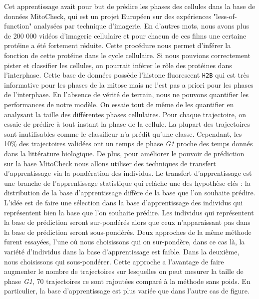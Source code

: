 \documentclass{article}
\begin{document}
Cet apprentissage avait pour but de prédire les phases des cellules dans la base de données MitoCheck, qui est un projet Européen sur des expériences "less-of-function" analysées par technique d'imagerie. En d'autres mots, nous avons plus de 200 000 vidéos d'imagerie cellulaire et pour chacun de ces films une certaine protéine a été fortement réduite. Cette procédure nous permet d'inférer la fonction de cette protéine dans le cycle cellulaire. Si nous pouvions correctement pister et classifier les cellules, on pourrait inférer le rôle des protéines dans l'interphase. Cette base de données possède l'histone fluorescent \texttt{H2B} qui est très informative pour les phases de la mitose mais ne l'est pas a priori pour les phases de l'interphase. En l'absence de vérité de terrain, nous ne pouvons quantifier les performances de notre modèle. On essaie tout de même de les quantifier en analysant la taille des différentes phases cellulaires. Pour chaque trajectoire, on essaie de prédire à tout instant la phase de la cellule. La plupart des trajectoires sont inutilisables comme le classifieur n'a prédit qu'une classe. Cependant, les 10\% des trajectoires validées ont un temps de phase \textit{G1} proche des temps donnés dans la littérature biologique. De plus, pour améliorer le pouvoir de prédiction sur la base MitoCheck nous allons utiliser des techniques de transfert d'apprentissage via la pondération des individus. Le transfert d'apprentissage est une branche de l'apprentissage statistique qui relâche une des hypothèse clés : la distribution de la base d'apprentissage diffère de la base que l'on souhaite prédire. L'idée est de faire une sélection dans la base d'apprentissage des individus qui représentent bien la base que l'on souhaite prédire. Les individus qui représentent la base de prédiction seront sur-pondérés alors que ceux n'apparaissant pas dans la base de prédiction seront sous-pondérés. Deux approches de la même méthode furent essayées, l'une où nous choisissons qui on sur-pondère, dans ce cas là, la variété d'individus dans la base d'apprentissage est faible. Dans la deuxième, nous choisissons qui sous-pondérer. Cette approche a l'avantage de faire augmenter le nombre de trajectoires sur lesquelles on peut mesurer la taille de phase \textit{G1}, 70 trajectoires ce sont rajoutées comparé à la méthode sans poids. En particulier, la base d'apprentissage est plus variée que dans l'autre cas de figure.
\bigskip 
\end{document}
